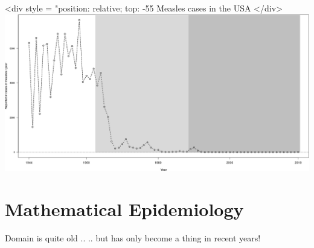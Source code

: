 \documentclass[aspectratio=169]{beamer}\usepackage[]{graphicx}\usepackage[]{xcolor}
\begin{document}
\begin{frame}
<div style = "position: relative; top: -55%
Measles cases in the USA
</div>
\includegraphics[width=\textwidth]{FIGS/measles_US_1944_2019.png}
\end{frame}


\section{Mathematical Epidemiology}

\begin{frame}{Domain is quite old ..}
.. but has only become a thing in recent years!
\end{frame}
\end{document}
